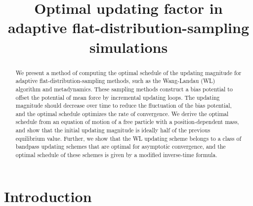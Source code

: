 \documentclass[reprint, floatfix]{revtex4-1}
\begin{document}
\title{Optimal updating factor in adaptive flat-distribution-sampling simulations}



\begin{abstract}
  We present a method of computing the optimal schedule
  of the updating magnitude
  for adaptive flat-distribution-sampling methods,
  such as the Wang-Landau (WL) algorithm and metadynamics.
  These sampling methods
  construct a bias potential to offset
  the potential of mean force
  by incremental updating loops.
  The updating magnitude should decrease over time
  to reduce the fluctuation of the bias potential,
  and the optimal schedule optimizes
  the rate of convergence.
  We derive the optimal schedule from
  an equation of motion
  of a free particle with a position-dependent mass,
  and show that
  the initial updating magnitude is ideally half of
  the previous equilibrium value.
  Further,
  we show that the WL updating scheme
  belongs to a class of bandpass updating schemes
  that are optimal for asymptotic convergence,
  and the optimal schedule of these schemes
  is given by a modified inverse-time formula.
\end{abstract}

\maketitle



\section{Introduction}
\end{document}
